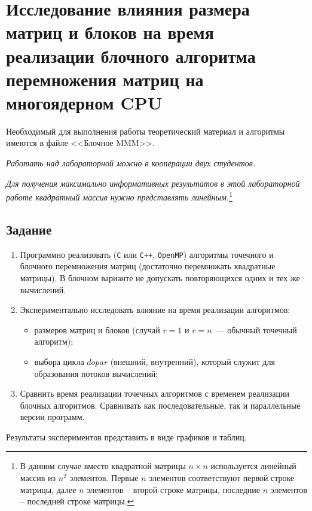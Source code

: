 

\section{Исследование влияния размера матриц и блоков на время реализации блочного алгоритма перемножения матриц на многоядерном CPU}

Необходимый для выполнения работы теоретический материал и алгоритмы имеются в файле <<Блочное MMM>>.

\textit{Работать над лабораторной можно в кооперации двух студентов.}

\textit{Для получения максимально информативных результатов в этой лабораторной работе квадратный массив нужно представлять линейным.}\footnote{В данном случае вместо квадратной матрицы $n \times n$ используется линейный массив из $n^2$ элементов. Первые $n$ элементов соответствуют первой строке матрицы, далее $n$ элементов -- второй строке матрицы, последние $n$ элементов -- последней строке матрицы.}

\subsection*{Задание}
\begin{enumerate}
    \item Программно реализовать (\texttt{С} или \texttt{C++}, \texttt{OpenMP}) алгоритмы точечного и блочного перемножения матриц (достаточно перемножать квадратные матрицы). В блочном варианте не допускать повторяющихся одних и тех же вычислений.
    \item Экспериментально исследовать влияние на время реализации алгоритмов:
    \begin{itemize}
        \item размеров матриц и блоков (случай $r=1$ и $r=n$~--- обычный точечный алгоритм);
        \item выбора цикла $dopar$ (внешний, внутренний), который служит для образования потоков вычислений;
    \end{itemize}
    \item Сравнить время реализации точечных алгоритмов с временем реализации блочных алгоритмов. Сравнивать как последовательные, так и параллельные версии программ.
\end{enumerate}

Результаты экспериментов представить в виде графиков и таблиц.

